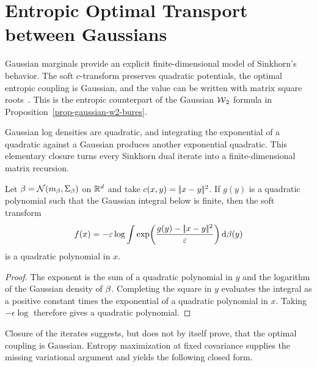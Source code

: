 \section{Entropic Optimal Transport between Gaussians}
\label{sec-gaussian-sinkhorn}

Gaussian marginals provide an explicit finite-dimensional model of Sinkhorn's behavior. The soft $c$-transform preserves quadratic potentials, the optimal entropic coupling is Gaussian, and the value can be written with matrix square roots~\cite{janati2020gaussian}. This is the entropic counterpart of the Gaussian $\operatorname{\mathcal{W}}_2$ formula in Proposition~\ref{prop-gaussian-w2-bures}.

Gaussian log densities are quadratic, and integrating the exponential of a quadratic against a Gaussian produces another exponential quadratic. This elementary closure turns every Sinkhorn dual iterate into a finite-dimensional matrix recursion.

\begin{prop}\label{prop-gaussian-sinkhorn-closure}
	Let $\beta=\mathcal{N}(m_\beta,\Sigma_\beta)$ on $\mathbb{R}^d$ and take $c(x,y)=|\!| x-y |\!|^2$. If $g(y)$ is a quadratic polynomial such that the Gaussian integral below is finite, then the soft transform
	\[
		f(x)
		=
		-\varepsilon\log
		\int
		\exp\!\left(\frac{g(y)-|\!| x-y |\!|^2}{\varepsilon}\right)
		\mathrm{d}\beta(y)
	\]
	is a quadratic polynomial in $x$.
\end{prop}

\begin{proof}
	The exponent is the sum of a quadratic polynomial in $y$ and the logarithm of the Gaussian density of $\beta$. Completing the square in $y$ evaluates the integral as a positive constant times the exponential of a quadratic polynomial in $x$. Taking $-\epsilon\log$ therefore gives a quadratic polynomial.
\end{proof}

Closure of the iterates suggests, but does not by itself prove, that the optimal coupling is Gaussian. Entropy maximization at fixed covariance supplies the missing variational argument and yields the following closed form.

